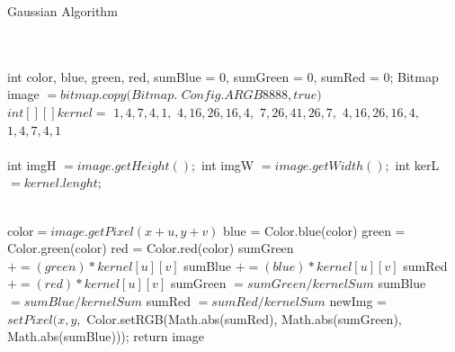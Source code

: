 \documentclass[conference]{IEEEtran}
\begin{document}
\begin{algorithm}
   \caption{Gaussian Algorithm}
    \begin{algorithmic}[1]
      \\
		\\
        \State int color, blue, green, red, sumBlue = 0, sumGreen = 0,				 \State sumRed = 0;
        \State  Bitmap image $= bitmap.copy(Bitmap.$
        \State $Config.ARGB8888, true)$
\\
		\State $int[ ][ ] kernel =$
          \State ${1, 4, 7, 4, 1},$
          \State ${4, 16, 26, 16, 4},$
                        \State ${7, 26, 41, 26, 7},$
                       \State $ {4, 16, 26, 16, 4},$
                        \State ${1, 4, 7, 4, 1} $
                        \\
                        \\
         \State int imgH $= image.getHeight(); $
        \State int imgW $= image.getWidth(); $
       \State int kerL $= kernel.lenght; $
        
\\
						\State color$= image.getPixel(x+u,y+v)$
						\State blue = Color.blue(color)
            				\State green = Color.green(color)
            				\State red = Color.red(color)
            				\State sumGreen $+= (green)*kernel[u][v]$
            				\State sumBlue $+= (blue)*kernel[u][v]$
            				\State sumRed $+= (red)*kernel[u][v]$
            			\EndFor
				\EndFor
				\State sumGreen $=sumGreen/kernelSum$
				\State sumBlue $=sumBlue/kernelSum$
				\State sumRed $=sumRed/kernelSum$
				\State newImg = $ setPixel(x, y, $				
				\State Color.setRGB(Math.abs(sumRed), 
				\State Math.abs(sumGreen), Math.abs(sumBlue)));
        		\EndFor
        \EndFor
        \State return image
       \EndFunction

\end{algorithmic}
\end{algorithm}
\end{document}
